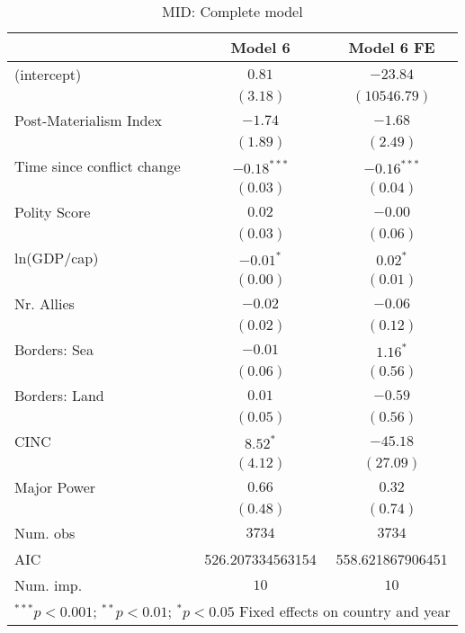 
\begin{table}
\begin{center}
\begin{tabular}{l c c}
\toprule
 & Model 6 & Model 6 FE \\
\midrule
(intercept)                & $0.81$           & $-23.84$         \\
                           & $(3.18)$         & $(10546.79)$     \\
Post-Materialism Index     & $-1.74$          & $-1.68$          \\
                           & $(1.89)$         & $(2.49)$         \\
Time since conflict change & $-0.18^{***}$    & $-0.16^{***}$    \\
                           & $(0.03)$         & $(0.04)$         \\
Polity Score               & $0.02$           & $-0.00$          \\
                           & $(0.03)$         & $(0.06)$         \\
ln(GDP/cap)                & $-0.01^{*}$      & $0.02^{*}$       \\
                           & $(0.00)$         & $(0.01)$         \\
Nr. Allies                 & $-0.02$          & $-0.06$          \\
                           & $(0.02)$         & $(0.12)$         \\
Borders: Sea               & $-0.01$          & $1.16^{*}$       \\
                           & $(0.06)$         & $(0.56)$         \\
Borders: Land              & $0.01$           & $-0.59$          \\
                           & $(0.05)$         & $(0.56)$         \\
CINC                       & $8.52^{*}$       & $-45.18$         \\
                           & $(4.12)$         & $(27.09)$        \\
Major Power                & $0.66$           & $0.32$           \\
                           & $(0.48)$         & $(0.74)$         \\
\midrule
Num. obs                   & $3734$           & $3734$           \\
AIC                        & 526.207334563154 & 558.621867906451 \\
Num. imp.                  & $10$             & $10$             \\
\bottomrule
\multicolumn{3}{l}{\scriptsize{$^{***}p<0.001$; $^{**}p<0.01$; $^{*}p<0.05$ 
 Fixed effects on country and year}}
\end{tabular}
\caption{MID: Complete model}
\label{MID_3_PM}
\end{center}
\end{table}
